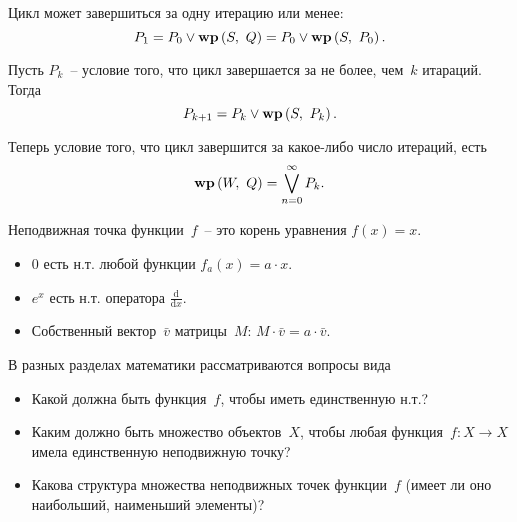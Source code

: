 \documentclass[landscape]{slides}
\begin{document}
\begin{slide}
        Цикл может завершиться за одну итерацию или менее:
        \[
                P_1 = P_0 \lor \mathbf{wp}\left({S},\ {Q}\right) = P_0 \lor \mathbf{wp}\left({S},\ {P_0}\right) .
        \]

        Пусть $P_k$~-- условие того, что цикл завершается за не более, чем~$k$ итараций.
        Тогда
        \[
                P_{k+1} = P_k \lor \mathbf{wp}\left({S},\ {P_k}\right) .
        \]

        Теперь условие того, что цикл завершится за какое-либо число итераций, есть
        \[
                \mathbf{wp}\left({W},\ {Q}\right) = \bigvee_{n=0}^{\infty} P_k .
        \]
\end{slide}

\begin{slide}
        Неподвижная точка функции~$f$~-- это корень уравнения $f(x)=x$.
        \begin{itemize}
                \item 0 есть н.т. любой функции $f_a(x) = a\cdot x$.
                \item $e^x$ есть н.т. оператора $\frac{\mathrm{d}}{\mathrm{d} x}$.
                \item Собственный вектор~$\bar{v}$ матрицы~$M$: $M\cdot \bar{v} = a \cdot \bar{v}$.
        \end{itemize}

        В разных разделах математики рассматриваются вопросы вида
        \begin{itemize}
                \item Какой должна быть функция~$f$, чтобы иметь единственную н.т.?
                \item Каким должно быть множество объектов~$X$, чтобы любая функция~$f: X \to X$ имела единственную неподвижную точку?
                \item Какова структура множества неподвижных точек функции~$f$ (имеет ли оно наибольший, наименьший элементы)?
        \end{itemize}
\end{slide}
\end{document}
